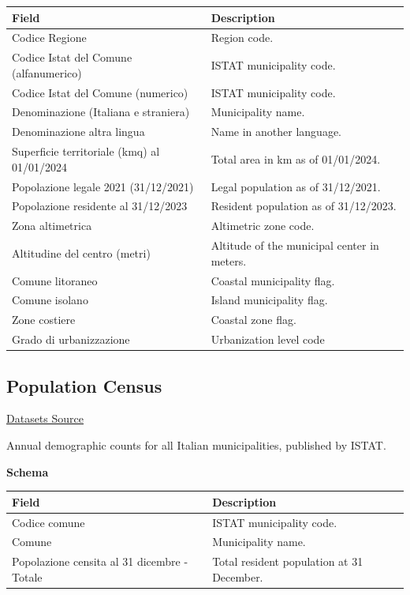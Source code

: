 \documentclass{article}
\begin{document}
	\begin{table}[H]
		\centering
		\begin{tabular}{ll}
			\hline
			Field & Description \\
			\hline
			Codice Regione & Region code. \\
			Codice Istat del Comune (alfanumerico) & ISTAT municipality code. \\
			Codice Istat del Comune (numerico) & ISTAT municipality code. \\
			Denominazione (Italiana e straniera) & Municipality name. \\
			Denominazione altra lingua & Name in another language. \\
			Superficie territoriale (kmq) al 01/01/2024 & Total area in km as of 01/01/2024. \\
			Popolazione legale 2021 (31/12/2021) & Legal population as of 31/12/2021. \\
			Popolazione residente al 31/12/2023 & Resident population as of 31/12/2023. \\
			Zona altimetrica & Altimetric zone code. \\
			Altitudine del centro (metri) & Altitude of the municipal center in meters. \\
			Comune litoraneo & Coastal municipality flag. \\
			Comune isolano & Island municipality flag. \\
			Zone costiere & Coastal zone flag. \\
			Grado di urbanizzazione & Urbanization level code \\
			\hline
		\end{tabular}
	\end{table}
	
	\subsection{Population Census}
	
	\href{https://demo.istat.it/app/?a=2025&l=it&i=POS}{Datasets Source}
	
	Annual demographic counts for all Italian municipalities, published by ISTAT.
	
	\textbf{Schema}
	
	\begin{table}[H]
		\centering
		\begin{tabular}{ll}
			\hline
			Field & Description \\
			\hline
			Codice comune & ISTAT municipality code. \\
			Comune & Municipality name. \\
			Popolazione censita al 31 dicembre - Totale & Total resident population at 31 December. \\
			\hline
		\end{tabular}
	\end{table}
	
\end{document}
